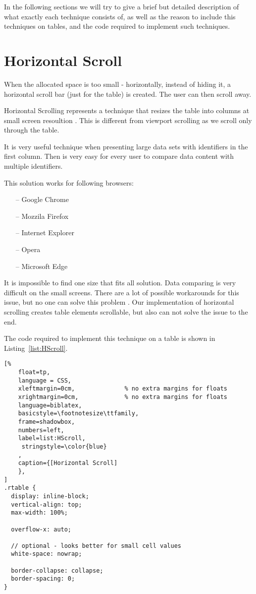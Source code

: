 In the following sections we will try to give a brief but detailed
description of what exactly each technique consists of, as well as the
reason to include this techniques on tables, and the code required to
implement such techniques.

\section{Horizontal Scroll}
When the allocated space is too small - horizontally, instead of
hiding it, a horizontal scroll bar (just for the table) is created.
The user can then scroll away.

Horizontal Scrolling represents a technique that resizes the table
into columns at small screen resoultion \parencite{HS_1}. 
This is different from viewport scrolling as we scroll only through 
the table.

It is very useful technique when presenting large data
 sets with identifiers in the first column. Then is very easy for 
 every user to compare data content with 
 multiple identifiers\parencite{HS}.

This solution works for following browsers:
\begin{itemize}
    \item[--] Google Chrome
    \item[--] Mozzila Firefox
    \item[--] Internet Explorer
    \item[--] Opera
    \item[--] Microsoft Edge
\end{itemize}

It is impossible to find one size that fits all solution. Data 
comparing is very difficult on the small screens.
There are a lot of possible workarounds for this issue, but no 
one can solve this problem \parencite{HS_1}.
Our implementation of horizontal scrolling creates table elements
 scrollable, but also can not solve the issue 
 to the end\parencite{HS_1}.

The code required to implement this technique 
on a table is shown in Listing~\ref{list:HScroll}.

\begin{lstlisting}[%
    float=tp,
    language = CSS,
    xleftmargin=0cm,              % no extra margins for floats
    xrightmargin=0cm,             % no extra margins for floats
    language=biblatex,
    basicstyle=\footnotesize\ttfamily,
    frame=shadowbox,
    numbers=left,
    label=list:HScroll,
     stringstyle=\color{blue}
    ,
    caption={[Horizontal Scroll]
    },
]
.rtable {
  display: inline-block;
  vertical-align: top;
  max-width: 100%;

  overflow-x: auto;

  // optional - looks better for small cell values
  white-space: nowrap;

  border-collapse: collapse;
  border-spacing: 0;
}

\end{lstlisting}

